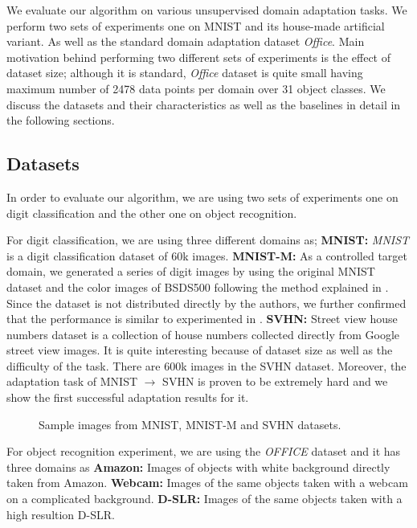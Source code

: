We evaluate our algorithm on various unsupervised domain adaptation tasks. We perform two sets of experiments one on MNIST and its house-made artificial variant. As well as the standard domain adaptation dataset \emph{Office}\cite{office}. Main motivation behind performing two different sets of experiments is the effect of dataset size; although it is standard,  \emph{Office} dataset is quite small having maximum number of 2478 data points per domain over 31 object classes. We discuss the datasets and their characteristics as well as the baselines in detail in the following sections.

\subsection{Datasets}
In order to evaluate our algorithm, we are using two sets of experiments one on digit classification and the other one on object recognition. 

For digit classification, we are using three different domains as;
\noindent\textbf{MNIST\cite{mnist}:} \emph{MNIST} is a digit classification dataset of 60k images. 
\noindent\textbf{MNIST-M:} As a controlled target domain, we generated a series of digit images by using the original MNIST dataset and the color images of BSDS500\cite{bsds500} following the method explained in \cite{ganin}. Since the dataset is not distributed directly by the authors, we further confirmed that the performance is similar to experimented in \cite{ganin}.
\noindent\textbf{SVHN\cite{svhn}:} Street view house numbers dataset is a collection of house numbers collected directly from Google street view images. It is quite interesting because of dataset size as well as the difficulty of the task. There are 600k images in the SVHN\cite{svhn} dataset. Moreover, the adaptation task of MNIST $\rightarrow$ SVHN is proven to be extremely hard and we show the first successful adaptation results for it.

\begin{figure}
\caption{Sample images from MNIST, MNIST-M and SVHN datasets.}
\end{figure}

For object recognition experiment, we are using the \emph{OFFICE}\cite{office} dataset and it has three domains as
\noindent\textbf{Amazon:} Images of objects with white background directly taken from Amazon.
\noindent\textbf{Webcam:} Images of the same objects taken with a webcam on a complicated background.
\noindent\textbf{D-SLR:} Images of the same objects taken with a high resultion D-SLR.

